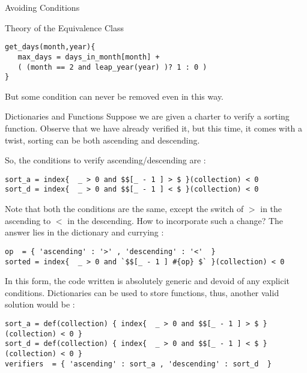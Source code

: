 \begin{section}{Avoiding Conditions}
\begin{subsection}{Theory of the Equivalence Class}
\begin{lstlisting}[style=JexlStyle]
get_days(month,year){
   max_days = days_in_month[month] + 
   ( (month == 2 and leap_year(year) )? 1 : 0 )
}
\end{lstlisting} 
But some condition can never be removed even in this way.
\end{subsection}

\begin{subsection}{Dictionaries and Functions}
Suppose we are given a charter to verify a sorting function.
Observe that we have already verified it, but this time, 
it comes with a twist, sorting can be both ascending and descending.

So, the conditions to verify ascending/descending are :

\begin{lstlisting}[style=JexlStyle]
sort_a = index{  _ > 0 and $$[_ - 1 ] > $ }(collection) < 0 
sort_d = index{  _ > 0 and $$[_ - 1 ] < $ }(collection) < 0 
\end{lstlisting} 

Note that both the conditions are the same, except the switch of $>$ in the ascending 
to  $<$ in the descending. How to incorporate such a change?
The answer lies in the dictionary and currying :

\begin{lstlisting}[style=JexlStyle]
op  = { 'ascending' : '>' , 'descending' : '<'  }
sorted = index{  _ > 0 and `$$[_ - 1 ] #{op} $` }(collection) < 0 
\end{lstlisting} 

In this form, the code written is absolutely generic and devoid of any explicit conditions.
Dictionaries can be used to store functions, thus, another valid solution would be :

\begin{lstlisting}[style=JexlStyle]
sort_a = def(collection) { index{  _ > 0 and $$[_ - 1 ] > $ }(collection) < 0 }
sort_d = def(collection) { index{  _ > 0 and $$[_ - 1 ] < $ }(collection) < 0 }
verifiers  = { 'ascending' : sort_a , 'descending' : sort_d  }
\end{lstlisting} 
\end{subsection}


\end{section}
